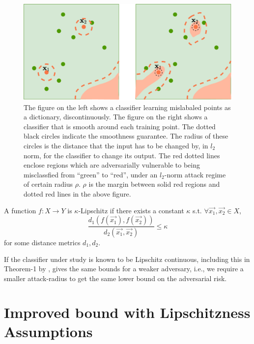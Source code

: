 \documentclass{ociamthesis}
\begin{document}
\begin{figure}
    \centering
    \includegraphics[scale=0.3]{memorizing-as-dictionary}
    \caption{The figure on the left shows a classifier learning mislabaled
    points as a dictionary, discontinuously. The figure on the right shows a
    classifier that is smooth around each training point. The dotted black
    circles indicate the smoothness guarantee. The radius of these circles is
    the distance that the input has to be changed by, in $l_2$ norm, for the
    classifier to change its output. The red dotted lines enclose regions which
    are adversarially vulnerable to being misclassfied from ``green'' to
    ``red'', under an $l_2$-norm attack regime of certain radius $\rho$. $\rho$
    is the margin between solid red regions and dotted red lines in the above
    figure.}
    \label{fig:dictionary}
\end{figure}

\begin{figure}
    \centering

\end{figure}

A function $f: X \to Y$ is $\kappa$-Lipschitz if there exists a constant
$\kappa$ s.t. $\forall \vec{x_1}, \vec{x_2} \in X$,
\begin{equation*}
    \label{eq:Lipschitz}
    \frac{d_1({f(\vec{x_1}), f(\vec{x_2})})}
        {d_2({\vec{x_1}, \vec{x_2}})}
    \leq \kappa
\end{equation*}
for some distance metrics $d_1, d_2$.

If the classifier under study is known to be Lipschitz continuous, including
this in Theorem-1 by \citet{sanyal2021how}, gives the same bounds for a weaker
adversary, i.e., we require a smaller attack-radius to get the same lower bound
on the adversarial risk.

\section{Improved bound with Lipschitzness Assumptions}
\end{document}
